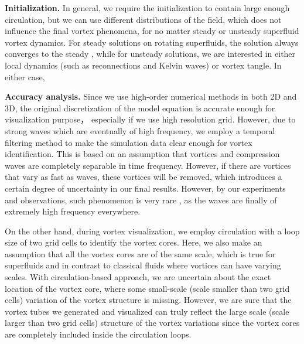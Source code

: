 \documentclass[10pt,journal,compsoc,twoside]{IEEEtran}
\newcommand{\rd}[1]{{\color[rgb]{0.0,0.0,0.0}{#1}}}
\begin{document}
	\vspace{0.1cm}
	\noindent
	\textbf{Initialization.}
	In general, we require the initialization to contain large enough circulation, but we can use different distributions of the field, which does not influence the final vortex phenomena, for no matter steady or unsteady superfluid vortex dynamics.
	For steady solutions on rotating superfluids, the solution always converges to the steady \rd{vortex lattice (or vortex ring in 3D) structure}, while for unsteady solutions, we are interested in either local dynamics (such as reconnections and Kelvin waves) or vortex tangle.
	In either case, \rd{although some initial conditions are
		artificial, the underlying motions are strictly under the corresponding physical law by the model, which can result in believable phenomena that could be observed in practice, and our method can produce some phenomena that can be truly observed in real experiments.}
	
	\vspace{0.1cm}
	\noindent
	\textbf{Accuracy analysis.}
	Since we use high-order numerical methods in both 2D and 3D, the original discretization of the model equation is accurate enough for visualization purpose， especially if we use high resolution grid.
	However, due to strong waves which are eventually of high frequency, we employ a temporal filtering method to make the simulation data clear enough for vortex identification.
	This is based on an assumption that vortices and compression waves are completely separable in time frequency.
	However, if there are vortices that vary as fast as waves, these vortices will be removed, which introduces a certain degree of uncertainty in our final results.
	However, by our experiments and observations, such phenomenon is very rare \rd{in most cases}, as the waves are finally of extremely high frequency everywhere.
		
	On the other hand, during vortex visualization, we employ circulation with a loop size of two grid cells to identify the vortex cores.
	Here, we also make an assumption that all the vortex cores are of the same scale, which is true for superfluids and in contrast to classical fluids where vortices can have varying scales.
	With circulation-based approach, we are uncertain about the exact location of the vortex core, where some small-scale (scale smaller than two grid cells) variation of the vortex structure is missing.
	However, we are sure that the vortex tubes we generated and visualized can truly reflect the large scale (scale larger than two grid cells) structure of the vortex variations since the vortex cores are completely included inside the circulation loops.
		
\end{document}

